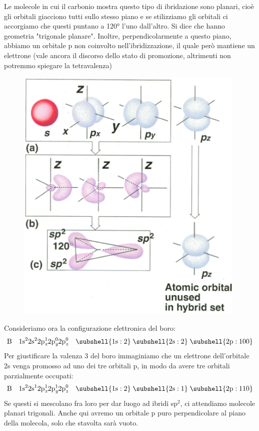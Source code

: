 Le molecole in cui il carbonio mostra questo tipo di ibridazione sono planari, cioè gli orbitali giacciono tutti sullo stesso piano e se stilizziamo gli orbitali ci accorgiamo che questi puntano a 120° l'uno dall'altro. Si dice che hanno geometria "trigonale planare". Inoltre, perpendicolarmente a questo piano, abbiamo un orbitale p non coinvolto nell'ibridizzazione, il quale però mantiene un elettrone (vale ancora il discorso dello stato di promozione, altrimenti non potremmo spiegare la tetravalenza)

\begin{figure}[H]
    \centering
    \includegraphics[width=11cm]{immagini/orbitali-sp2.png}
\end{figure}

Consideriamo ora la configurazione elettronica del boro:
$$\rm \text{B} \quad 1s^22s^22p_\textit{x}^12p_\textit{y}^02p_\textit{z}^0 \quad \subshell{1s:2} \; \subshell{2s:2} \; \subshell{2p:100}$$
Per giustificare la valenza 3 del boro immaginiamo che un elettrone dell'orbitale 2s venga promosso ad uno dei tre orbitali p, in modo da avere tre orbitali parzialmente occupati: 
$$\rm \text{B} \quad 1s^22s^12p_\textit{x}^12p_\textit{y}^12p_\textit{z}^0 \quad \subshell{1s:2} \; \subshell{2s:1} \; \subshell{2p:110}
$$
Se questi si mescolano fra loro per dar luogo ad ibridi sp$^2$, ci attendiamo molecole planari trigonali. Anche qui avremo un orbitale p puro perpendicolare al piano della molecola, solo che stavolta sarà vuoto.

